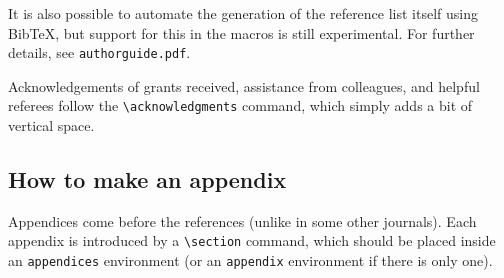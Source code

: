 \documentclass[debug]{rmxaa}
\newcommand{\CS}[1]{\texttt{\textbackslash #1}}
\begin{document}
It is also possible to automate the generation of the reference list
itself using BibTeX, but support for this in the macros is still
experimental. For further details, see \texttt{authorguide.pdf}.

\acknowledgments Acknowledgements of grants received, assistance from
colleagues, and helpful referees follow the \CS{acknowledgments}
command, which simply adds a bit of vertical space.

\begin{appendix}
  \section{How to make an appendix}
  Appendices come before the references (unlike in some other
  journals). Each appendix is introduced by a \CS{section} command,
  which should be placed inside an \texttt{appendices} environment (or
  an \texttt{appendix} environment if there is only one).
\end{appendix}



\end{document}
